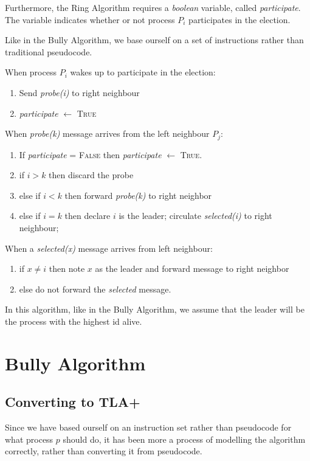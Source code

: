 \documentclass{report}
\begin{document}
Furthermore, the Ring Algorithm requires a \textit{boolean} variable, called \textit{participate}. The variable indicates whether or not process $P_{i}$ participates in the election.

Like in the Bully Algorithm, we base ourself on a set of instructions rather than traditional pseudocode.

\noindent
When process $P_{i}$ wakes up to participate in the election:
\begin{enumerate}
  \item Send \textit{probe(i)} to right neighbour
        \item \textit{participate }$\leftarrow $ \textsc{True}
\end{enumerate}

\noindent
When \textit{probe(k)} message arrives from the left neighbour $P_{j}$:
\begin{enumerate}
  \item If \textit{participate} = \textsc{False} then \textit{participate} $\leftarrow$ \textsc{True}.
  \item if $i > k$ then discard the probe
  \item else if $i < k$ then forward \textit{probe(k)} to right neighbor
  \item else if $i = k$ then declare $i$ is the leader; circulate \textit{selected(i)} to right neighbour;
\end{enumerate}

\noindent
When a \textit{selected(x)} message arrives from left neighbour:
\begin{enumerate}
  \item if $x \neq i$ then note $x$ as the leader and forward message to right neighbor
        \item else do not forward the \textit{selected} message.
\end{enumerate}

In this algorithm, like in the Bully Algorithm, we assume that the leader will be the process with the highest id alive.

\chapter{Bully Algorithm}

\section{Converting to TLA+}
Since we have based ourself on an instruction set rather than pseudocode for what process $p$ should do, it has been more a process of modelling the algorithm correctly, rather than converting it from pseudocode.
\end{document}
